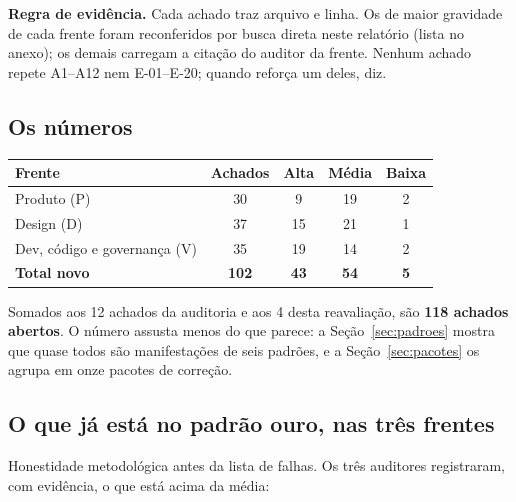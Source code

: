 \documentclass[11pt,a4paper]{article}
\begin{document}
\textbf{Regra de evidência.} Cada achado traz arquivo e linha. Os de maior gravidade de cada
frente foram reconferidos por busca direta neste relatório (lista no anexo); os demais carregam a
citação do auditor da frente. Nenhum achado repete A1--A12 nem E-01--E-20; quando reforça um deles,
diz.

\subsection{Os números}

\begin{center}\small
\begin{tabular}{@{}l c c c c@{}}
\toprule
\textbf{Frente} & \textbf{Achados} & \textbf{Alta} & \textbf{Média} & \textbf{Baixa} \\
\midrule
Produto (P) & 30 & 9 & 19 & 2 \\
Design (D) & 37 & 15 & 21 & 1 \\
Dev, código e governança (V) & 35 & 19 & 14 & 2 \\
\midrule
\textbf{Total novo} & \textbf{102} & \textbf{43} & \textbf{54} & \textbf{5} \\
\bottomrule
\end{tabular}
\end{center}

Somados aos 12 achados da auditoria e aos 4 desta reavaliação, são \textbf{118 achados abertos}.
O número assusta menos do que parece: a Seção~\ref{sec:padroes} mostra que quase todos são
manifestações de seis padrões, e a Seção~\ref{sec:pacotes} os agrupa em onze pacotes de correção.

\subsection{O que já está no padrão ouro, nas três frentes}

Honestidade metodológica antes da lista de falhas. Os três auditores registraram, com evidência, o
que está acima da média:
\end{document}
